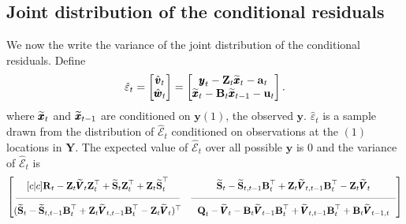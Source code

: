 \documentclass[]{article}
\def\UPS{\mbox{\boldmath $\Upsilon$}}
\def\XI{\mbox{\boldmath $\Xi$}}
\def\BB{\mbox{$\mathbf B$}}	\def\bb{\mbox{$\mathbf b$}} \def\Bb{\mbox{$\mathbf J$}} \def\Ba{\mbox{$\mathbf L$}} \def\Bm{\UPS}
\def\QQ{\mbox{$\mathbf Q$}}	 \def\qq{\mbox{$\mathbf q$}} \def\Qb{\mbox{$\mathbf G$}}  \def\Qm{\mathbb{Q}}
\def\RR{\mbox{$\mathbf R$}}	 \def\rr{\mbox{$\mathbf r$}} \def\Rb{\mbox{$\mathbf H$}}	\def\Rm{\mathbb{R}}
\def\Ss{\mbox{$\mathbf S$}}
\def\VV{\mbox{$\pmb{V}$}}	\def\vv{\mbox{$\pmb{v}$}}
\def\YY{\mbox{$\pmb{Y}$}}	\def\yy{\mbox{$\pmb{y}$}}
\def\ZZ{\mbox{$\mathbf Z$}}	\def\zz{\mbox{$\mathbf z$}}	\def\Zb{\mbox{$\mathbf M$}} \def\Za{\mbox{$\mathbf N$}} \def\Zm{\XI}
\def\hatxt{\widetilde{\xx}_t}
\def\hatxtm{\widetilde{\mbox{$\xx$}}_{t-1}}
\def\hatVt{\widetilde{\VV}_t}
\def\hatVtm{\widetilde{\VV}_{t-1}}
\def\hatVttm{\widetilde{\VV}_{t,t-1}}
\def\hatSt{\widetilde{\Ss}_t}
\def\hatSttm{\widetilde{\Ss}_{t,t-1}}
\begin{document}
\subsection{Joint distribution of the conditional residuals}
We now the write the variance of the joint distribution of the conditional residuals. Define
\begin{equation}
\hat{\varepsilon}_t = \begin{bmatrix}\hat{\vv}_t\\ \hat{\ww}_t\end{bmatrix} =
\begin{bmatrix}\yy_t - \ZZ_t\hatxt-\aa_t\\ \hatxt - \BB_t\hatxtm-\uu_t \end{bmatrix}.
\end{equation}
where $\hatxt$ and $\hatxtm$ are conditioned on $\yy{(1)}$, the observed $\yy$.
$\hat{\varepsilon}_t$ is a sample drawn from the distribution of $\hat{\mathcal{E}}_t$ conditioned on observations at the $(1)$ locations in $\YY$.  The expected value of $\hat{\mathcal{E}}_t$ over all possible $\yy$ is 0 and the variance of $\hat{\mathcal{E}}_t$  is
\begin{equation}\label{eqn:jointcondresid1general}
 \begin{bmatrix}[c|c]
 \RR_t - \ZZ_t \hatVt \ZZ_t^\top + \hatSt\ZZ_t^\top+\ZZ_t\hatSt^\top&
 \hatSt - \hatSttm\BB_t^\top  + \ZZ_t\hatVttm\BB_t^\top - \ZZ_t\hatVt \\
 \rule[.5ex]{40ex}{0.25pt} & \rule[.5ex]{50ex}{0.25pt} \\
 (\hatSt - \hatSttm\BB_t^\top  + \ZZ_t\hatVttm\BB_t^\top - \ZZ_t\hatVt)^\top& 
 \QQ_t - \hatVt - \BB_t \hatVtm \BB_t^\top + \hatVttm \BB_t^\top + \BB_t\widetilde{\VV}_{t-1,t} \end{bmatrix}
\end{equation}
\end{document}
